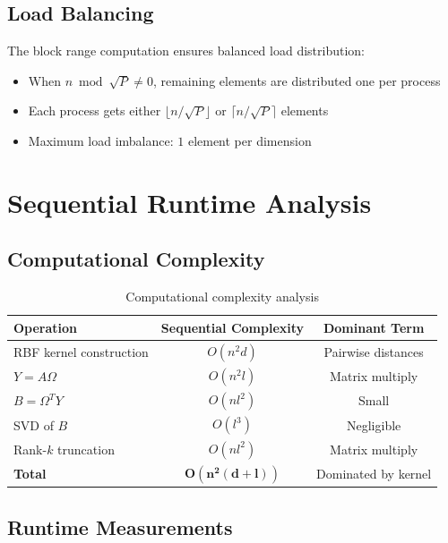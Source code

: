 \documentclass[11pt,a4paper]{article}
\begin{document}
\subsection{Load Balancing}

The block range computation ensures balanced load distribution:

\begin{itemize}
    \item When $n \bmod \sqrt{P} \neq 0$, remaining elements are distributed one per process
    \item Each process gets either $\lfloor n/\sqrt{P} \rfloor$ or $\lceil n/\sqrt{P} \rceil$ elements
    \item Maximum load imbalance: $1$ element per dimension
\end{itemize}

\section{Sequential Runtime Analysis}

\subsection{Computational Complexity}

\begin{table}[h]
\centering
\begin{tabular}{@{}lcc@{}}
\toprule
Operation & Sequential Complexity & Dominant Term \\
\midrule
RBF kernel construction & $O(n^2 d)$ & Pairwise distances \\
$Y = A\Omega$ & $O(n^2 l)$ & Matrix multiply \\
$B = \Omega^T Y$ & $O(nl^2)$ & Small \\
SVD of $B$ & $O(l^3)$ & Negligible \\
Rank-$k$ truncation & $O(nl^2)$ & Matrix multiply \\
\midrule
\textbf{Total} & $\mathbf{O(n^2(d + l))}$ & Dominated by kernel \\
\bottomrule
\end{tabular}
\caption{Computational complexity analysis}
\label{tab:complexity}
\end{table}

\subsection{Runtime Measurements}
\end{document}
